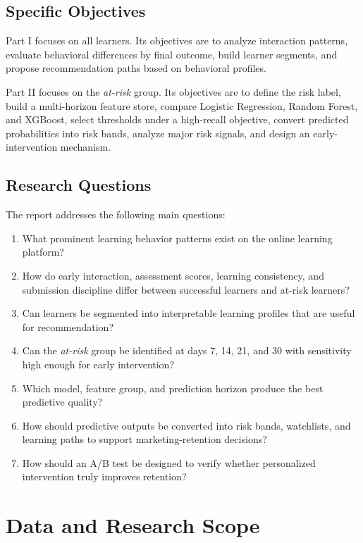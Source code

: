 \documentclass[conference]{IEEEtran}
\newcommand{\risk}{\textit{at-risk}}
\begin{document}
\subsection{Specific Objectives}

Part I focuses on all learners. Its objectives are to analyze interaction patterns, evaluate behavioral differences by final outcome, build learner segments, and propose recommendation paths based on behavioral profiles.

Part II focuses on the \risk{} group. Its objectives are to define the risk label, build a multi-horizon feature store, compare Logistic Regression, Random Forest, and XGBoost, select thresholds under a high-recall objective, convert predicted probabilities into risk bands, analyze major risk signals, and design an early-intervention mechanism.

\subsection{Research Questions}

The report addresses the following main questions:

\begin{enumerate}
    \item What prominent learning behavior patterns exist on the online learning platform?
    \item How do early interaction, assessment scores, learning consistency, and submission discipline differ between successful learners and at-risk learners?
    \item Can learners be segmented into interpretable learning profiles that are useful for recommendation?
    \item Can the \risk{} group be identified at days 7, 14, 21, and 30 with sensitivity high enough for early intervention?
    \item Which model, feature group, and prediction horizon produce the best predictive quality?
    \item How should predictive outputs be converted into risk bands, watchlists, and learning paths to support marketing-retention decisions?
    \item How should an A/B test be designed to verify whether personalized intervention truly improves retention?
\end{enumerate}

\section{Data and Research Scope}
\end{document}
